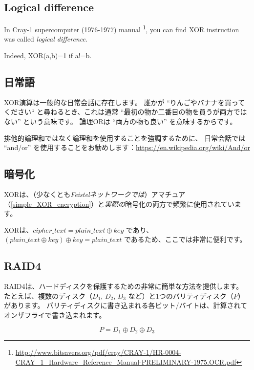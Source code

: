 ﻿
\label{XOR_property}



\subsection{Logical difference}

In Cray-1 supercomputer (1976-1977) manual
\footnote{\url{http://www.bitsavers.org/pdf/cray/CRAY-1/HR-0004-CRAY_1_Hardware_Reference_Manual-PRELIMINARY-1975.OCR.pdf}},
you can find XOR instruction was called \emph{logical difference}.

Indeed, XOR(a,b)=1 if a!=b.

\subsection{日常語}

XOR演算は一般的な日常会話に存在します。
誰かが ``りんごやバナナを買ってください``
と尋ねるとき、これは通常 ``最初の物か二番目の物を買うが両方ではない'' という意味です。
論理ORは ``両方の物も良い'' を意味するからです。

排他的論理和ではなく論理和を使用することを強調するために、
日常会話では ``and/or'' を使用することをお勧めします：\url{https://en.wikipedia.org/wiki/And/or}

\subsection{暗号化}

XORは、（少なくとも\emph{Feistelネットワークでは}）アマチュア（\ref{simple_XOR_encryption}）と\emph{実際の}暗号化の両方で頻繁に使用されています。

XORは、$cipher\_text = plain\_text \oplus key$ であり、
$(plain\_text \oplus key) \oplus key = plain\_text$
であるため、ここでは非常に便利です。

\subsection{\ac{RAID}4}

\ac{RAID}4は、ハードディスクを保護するための非常に簡単な方法を提供します。
たとえば、複数のディスク（$D_1$, $D_2$, $D_3$ など）と1つのパリティディスク（$P$）があります。
パリティディスクに書き込まれる各ビット/バイトは、計算されてオンザフライで書き込まれます。

\begin{equation} \label{eq:RAID4}
P = D_1 \oplus D_2 \oplus D_3
\end{equation}

